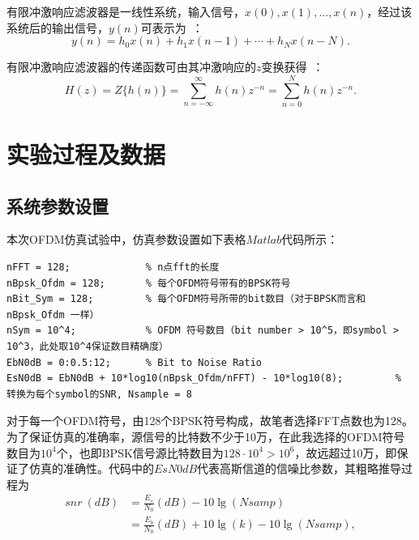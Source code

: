 \documentclass[a4paper,11pt,onecolumn,twoside]{article}
\begin{document}
有限冲激响应滤波器是一线性系统，输入信号，$x(0),x(1),...,x(n)$，经过该系统后的输出信号，$y(n)$可表示为~\supercite{course2}：
\begin{equation}
y(n) = h_0 x(n) + h_1 x(n-1) + \cdots + h_N x(n-N).
\end{equation}

有限冲激响应滤波器的传递函数可由其冲激响应的$z$变换获得~\supercite{course3}：
\begin{equation}
H(z) = Z\{h(n)\} = \sum_{n=- \infty}^{\infty} h(n) z^{-n} = \sum_{n=0}^{N} h(n) z^{-n}.
\end{equation}


\section{实验过程及数据}

\subsection{系统参数设置}
本次OFDM仿真试验中，仿真参数设置如下表格$Matlab$代码所示：

\begin{lstlisting}[style=Matlab-editor,
                   basicstyle=\mlttfamily,
                   caption={Parameter Set up}, label=code1]
nFFT = 128;             % n点fft的长度
nBpsk_Ofdm = 128;       % 每个OFDM符号带有的BPSK符号
nBit_Sym = 128;         % 每个OFDM符号所带的bit数目（对于BPSK而言和 nBpsk_Ofdm 一样）
nSym = 10^4;            % OFDM 符号数目（bit number > 10^5，即symbol > 10^3，此处取10^4保证数目精确度）
EbN0dB = 0:0.5:12;      % Bit to Noise Ratio
EsN0dB = EbN0dB + 10*log10(nBpsk_Ofdm/nFFT) - 10*log10(8);         % 转换为每个symbol的SNR, Nsample = 8
\end{lstlisting}

对于每一个OFDM符号，由128个BPSK符号构成，故笔者选择FFT点数也为128。为了保证仿真的准确率，源信号的比特数不少于10万，在此我选择的OFDM符号数目为$10^{4}$个，也即BPSK信号源比特数目为$128\cdot 10^{4} > 10^{6}$，故远超过10万，即保证了仿真的准确性。代码中的$EsN0dB$代表高斯信道的信噪比参数，其粗略推导过程为
\begin{equation*}
\begin{split}
snr~(dB) & = \frac{E_s}{N_0}(dB) - 10\lg (Nsamp) \\
& = \frac{E_b}{N_0}(dB) + 10\lg (k) - 10\lg (Nsamp),
\end{split}
\end{equation*}
\end{document}

